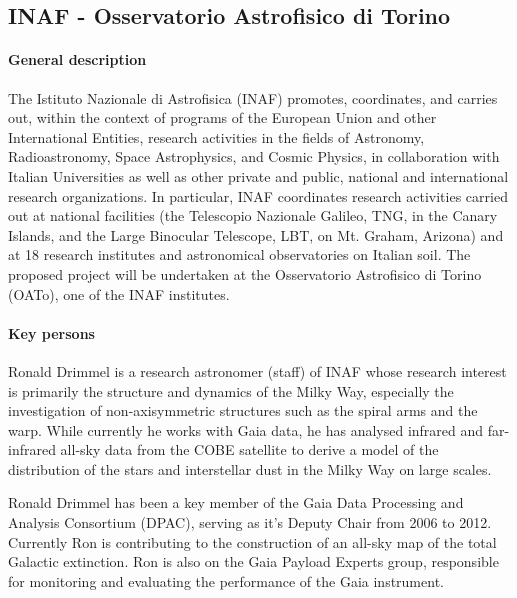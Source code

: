 \subsection{INAF - Osservatorio Astrofisico di Torino}
\label{sec:inaf}

\paragraph{General description}

The Istituto Nazionale di Astrofisica (INAF) promotes, coordinates, and carries out, within the context of programs of the European Union and other International Entities, research activities in the fields of Astronomy, Radioastronomy, Space Astrophysics, and Cosmic Physics, in collaboration with Italian Universities as well as other private and public, national and international research organizations. In particular, INAF coordinates research activities carried out at national facilities (the Telescopio Nazionale Galileo, TNG, in the Canary Islands, and the Large Binocular Telescope, LBT, on Mt. Graham, Arizona) and at 18 research institutes and astronomical observatories on Italian soil. The proposed project will be undertaken at the Osservatorio Astrofisico di Torino (OATo), one of the INAF institutes. 

\paragraph{Key persons}

Ronald Drimmel is a research astronomer (staff) of INAF whose research interest is primarily the structure and dynamics of the Milky Way, especially the investigation of non-axisymmetric structures such as the spiral arms and the warp. While currently he works with Gaia data, he has analysed infrared and far-infrared all-sky data from the COBE satellite to derive a model of the distribution of the stars and interstellar dust in the Milky Way on large scales. 

Ronald Drimmel has been a key member of the Gaia Data Processing and Analysis Consortium (DPAC), serving as it's Deputy Chair from 2006 to 2012. Currently Ron is contributing to the construction of an all-sky map of the total Galactic extinction. Ron is also on the Gaia Payload Experts group, responsible for monitoring and evaluating the performance of the Gaia instrument.

